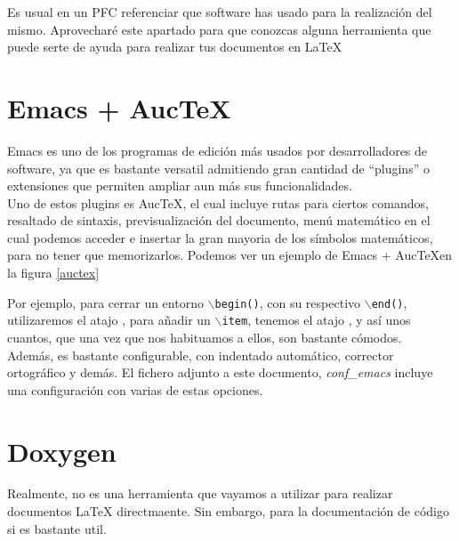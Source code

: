 
Es usual en un PFC referenciar que software has usado para la
realización del mismo. Aprovecharé este apartado para que conozcas
alguna herramienta que puede serte de ayuda para realizar tus
documentos en \LaTeX{}

\section*{Emacs + Auc\TeX}

Emacs es uno de los programas de edición más usados por
desarrolladores de software, ya que es bastante versatil admitiendo
gran cantidad de ``plugins'' o extensiones que permiten ampliar aun
más sus funcionalidades.\\

Uno de estos plugins es Auc\TeX \cite{pdf:auctex}, el cual incluye
rutas para ciertos comandos, resaltado de sintaxis, previsualización
del documento, menú matemático en el cual podemos acceder e insertar
la gran mayoria de los símbolos matemáticos, para no tener que
memorizarlos. Podemos ver un ejemplo de Emacs + Auc\TeX en la figura
\ref{auctex}


Por ejemplo, para cerrar un entorno $\backslash$\texttt{begin()}, con su
respectivo $\backslash$\texttt{end()}, utilizaremos el atajo
\comando{C-c M-]}, para añadir un $\backslash$\texttt{item}, tenemos
el atajo , y así unos cuantos, que una vez que nos
habituamos a ellos, son bastante cómodos.\\

Además, es bastante configurable, con indentado automático, corrector
ortográfico y demás. El fichero adjunto a este documento,
\emph{conf\_emacs} incluye una configuración con varias de estas
opciones.

\section*{Doxygen}

Realmente,  \cite{website:doxygen} no es una herramienta
que vayamos a utilizar para realizar documentos \LaTeX{}
directmaente. Sin embargo, para la documentación de código si es
bastante util.\\

